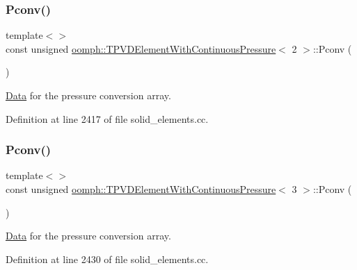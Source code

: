\subsubsection{\texorpdfstring{Pconv()}{Pconv()}\hspace{0.1cm}{\footnotesize\ttfamily [1/2]}}
{\footnotesize\ttfamily template$<$$>$ \\
const unsigned \hyperlink{classoomph_1_1TPVDElementWithContinuousPressure}{oomph\+::\+T\+P\+V\+D\+Element\+With\+Continuous\+Pressure}$<$ 2 $>$\+::Pconv (\begin{DoxyParamCaption}{ }\end{DoxyParamCaption})\hspace{0.3cm}{\ttfamily [protected]}}



\hyperlink{classoomph_1_1Data}{Data} for the pressure conversion array. 



Definition at line 2417 of file solid\+\_\+elements.\+cc.

\mbox{\label{classoomph_1_1TPVDElementWithContinuousPressure_a95d1f6f1e23f16350d61043b3451419e}} 
\subsubsection{\texorpdfstring{Pconv()}{Pconv()}\hspace{0.1cm}{\footnotesize\ttfamily [2/2]}}
{\footnotesize\ttfamily template$<$$>$ \\
const unsigned \hyperlink{classoomph_1_1TPVDElementWithContinuousPressure}{oomph\+::\+T\+P\+V\+D\+Element\+With\+Continuous\+Pressure}$<$ 3 $>$\+::Pconv (\begin{DoxyParamCaption}{ }\end{DoxyParamCaption})\hspace{0.3cm}{\ttfamily [protected]}}



\hyperlink{classoomph_1_1Data}{Data} for the pressure conversion array. 



Definition at line 2430 of file solid\+\_\+elements.\+cc.

